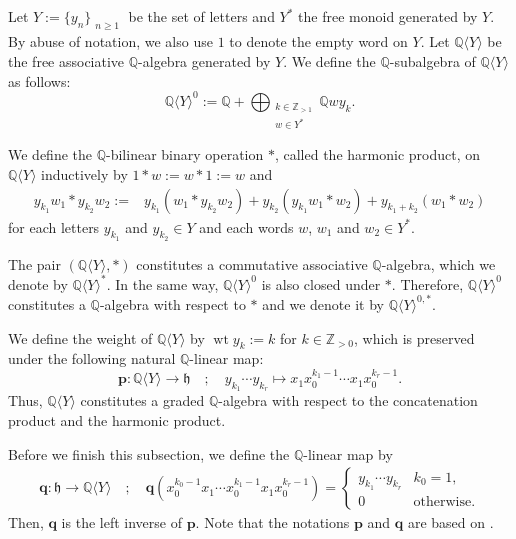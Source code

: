 \documentclass[15pt,oneside,reqno]{amsart}
\theoremstyle{remark}{
\newtheorem{lem}[df]{Lemma}
\newtheorem{prop}[df]{Proposition}
\newtheorem{ex}[df]{Example}
\newtheorem{rmk}[df]{Remark}
}
\newcommand{\ide}[1]{\mathfrak{#1}}
\newcommand{\Q}{\mathbb{Q}}
\DeclareMathOperator{\wt}{wt}
\begin{document}
Let $Y := \{y_{n}\}_{\substack{n\ge 1}}$ be the set of letters and $Y^*$ the free monoid generated by $Y$.
By abuse of notation, we also use $1$ to denote the empty word on $Y$. Let $\Q\langle Y \rangle$ be the free associative $\Q$-algebra generated by $Y$.
We define the $\Q$-subalgebra of $\Q\langle Y \rangle$ as follows: 
\[
\Q\langle Y \rangle^0 := \displaystyle \mathbb{Q} + \bigoplus_{\substack{k\in\mathbb{Z}_{>1}\\  w\in Y^*}} \Q wy_{k}.
\]


We define the $\mathbb{Q}$-bilinear binary operation $*$, called the harmonic product, on $\Q\langle Y \rangle$ inductively by $1 * w := w * 1 := w$ and
\begin{align*}
y_{k_1}w_1 * y_{k_2}w_2 :=& y_{k_1}(w_1 * y_{k_2} w_2) + y_{k_2}(y_{k_1}w_1 * w_2) + y_{k_1 + k_2}(w_1*w_2)
\end{align*}
for each letters $y_{k_1}$ and $y_{k_2} \in Y$ and each words $w$, $w_1$ and $w_2\in Y^*$.

The pair $(\Q\langle Y \rangle, *)$ constitutes a commutative associative $\mathbb{Q}$-algebra, which we denote by $\Q\langle Y \rangle^{*}$.
In the same way, $\Q\langle Y \rangle^0$ is also closed under $*$. Therefore, $\Q\langle Y \rangle^0$ constitutes a $\mathbb{Q}$-algebra with respect to $*$ and we denote it by $\Q\langle Y \rangle^{0,*}$.
\begin{rmk}{}{}
We define the weight of $\Q\langle Y \rangle$ by $\wt y_k := k$ for $k\in\mathbb{Z}_{>0}$,
which is preserved under the following natural $\Q$-linear map:
\[
\mathbf{p} : \Q\langle Y \rangle \rightarrow \ide{h}\quad ; \quad y_{k_1}\cdots y_{k_r} \mapsto x_1x_0^{k_1-1}\cdots x_1x_0^{k_r-1}.
\]
Thus, $\Q\langle Y \rangle$ constitutes a graded $\mathbb{Q}$-algebra with respect to the concatenation product and the harmonic product.
\end{rmk}

Before we finish this subsection, we define the $\mathbb{Q}$-linear map by
\begin{align*}
\mathbf{q} : \ide{h} \rightarrow \Q\langle Y \rangle \quad ; \quad \mathbf{q}(x_0^{k_0-1}x_1\cdots x_0^{k_1-1}x_1x_0^{k_{r}-1}) = 
\begin{cases}
y_{k_1}\cdots y_{k_r} & k_{0} = 1,\\
0& \text{otherwise.}
\end{cases}
\end{align*}
Then, $\mathbf{q}$ is the left inverse of $\mathbf{p}$.
Note that the notations $\mathbf{p}$ and $\mathbf{q}$ are based on \cite{Racinet}.
\end{document}
